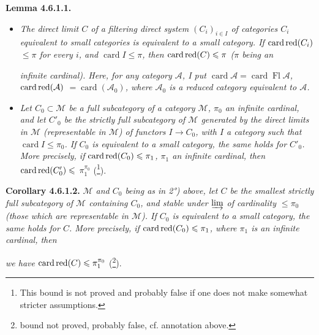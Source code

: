 \documentclass[11pt]{article}
\newcommand{\msp}[1]{\marginpar{\footnotesize [#1]}}
\newcommand{\cardred}{\mathop{\mathrm{card}\,\textup{red}}\nolimits}
\begin{document}
\textbf{Lemma 4.6.1.1.}
\begin{itemize}[leftmargin=2.5em]
\item[\textit{1°)}] \textit{The direct limit $C$ of a filtering direct system $(C_i)_{i\in I}$ of categories $C_i$ equivalent to small categories is equivalent to a small category. If $\cardred(C_i)$ $\leqslant\pi$ for every $i$, and $\operatorname{card}I\leqslant\pi$, then $\cardred(C)\leqslant\pi$ ($\pi$ being an} %

\msp{page 142}

\textit{infinite cardinal). Here, for any category $\mathcal{A}$, I put $\operatorname{card}\mathcal{A}=\operatorname{card}\operatorname{Fl}\mathcal{A}$, $\cardred(\mathcal{A})$ $=\operatorname{card}(\mathcal{A}_0)$, where $\mathcal{A}_0$ is a reduced category equivalent to $\mathcal{A}$.}
\item[\textit{2°)}] \textit{Let $C_0\subset\mathcal{M}$ be a full subcategory of a category $\mathcal{M}$, $\pi_0$ an infinite cardinal, and let $C'_0$ be the strictly full subcategory of $\mathcal{M}$ generated by the direct limits in $\mathcal{M}$ (representable in $\mathcal{M}$) of functors $I\longrightarrow C_0$, with $I$ a category such that $\operatorname{card}I\leqslant\pi_0$. If $C_0$ is equivalent to a small category, the same holds for $C'_0$. More precisely, if $\cardred(C_0)\leqslant\pi_1$, $\pi_1$ an infinite cardinal, then $\cardred(C'_0)\leqslant$ $\pi_1^{\pi_0}$} (\footnote[56]{This bound is not proved and probably false if one does not make somewhat stricter assumptions.}). %
\end{itemize}

\textbf{Corollary 4.6.1.2.} \textit{$\mathcal{M}$ and $C_0$ being as in 2°) above, let $C$ be the smallest strictly full subcategory of $\mathcal{M}$ containing $C_0$, and stable under $\varinjlim$ of cardinality $\leqslant\pi_0$ (those which are representable in $\mathcal{M}$). If $C_0$ is equivalent to a small category, the same holds for $C$. More precisely, if $\cardred(C_0)\leqslant\pi_1$, where $\pi_1$ is an infinite cardinal, then}

\msp{page 143}

\textit{we have $\cardred(C)\leqslant\pi_1^{\pi_0}$} (\footnote[57]{bound not proved, probably false, cf. annotation above.}).
\end{document}
